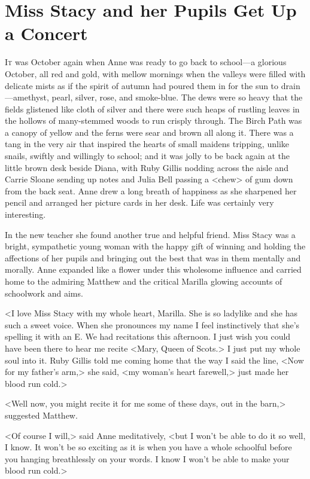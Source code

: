 \chapter{Miss Stacy and her Pupils Get Up a Concert}

\lettrine{I}{t} was October again when Anne was ready to go back to school—a glorious October, all red and gold, with mellow mornings when the valleys were filled with delicate mists as if the spirit of autumn had poured them in for the sun to drain—amethyst, pearl, silver, rose, and smoke-blue. The dews were so heavy that the fields glistened like cloth of silver and there were such heaps of rustling leaves in the hollows of many-stemmed woods to run crisply through. The Birch Path was a canopy of yellow and the ferns were sear and brown all along it. There was a tang in the very air that inspired the hearts of small maidens tripping, unlike snails, swiftly and willingly to school; and it was jolly to be back again at the little brown desk beside Diana, with Ruby Gillis nodding across the aisle and Carrie Sloane sending up notes and Julia Bell passing a <chew> of gum down from the back seat. Anne drew a long breath of happiness as she sharpened her pencil and arranged her picture cards in her desk. Life was certainly very interesting.

In the new teacher she found another true and helpful friend. Miss Stacy was a bright, sympathetic young woman with the happy gift of winning and holding the affections of her pupils and bringing out the best that was in them mentally and morally. Anne expanded like a flower under this wholesome influence and carried home to the admiring Matthew and the critical Marilla glowing accounts of schoolwork and aims.

<I love Miss Stacy with my whole heart, Marilla. She is so ladylike and she has such a sweet voice. When she pronounces my name I feel instinctively that she's spelling it with an E\@. We had recitations this afternoon. I just wish you could have been there to hear me recite <Mary, Queen of Scots.> I just put my whole soul into it. Ruby Gillis told me coming home that the way I said the line, <Now for my father's arm,> she said, <my woman's heart farewell,> just made her blood run cold.>

<Well now, you might recite it for me some of these days, out in the barn,> suggested Matthew.

<Of course I will,> said Anne meditatively, <but I won't be able to do it so well, I know. It won't be so exciting as it is when you have a whole schoolful before you hanging breathlessly on your words. I know I won't be able to make your blood run cold.>

